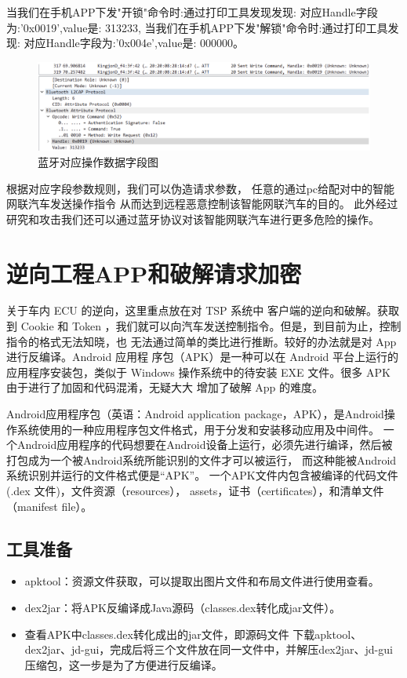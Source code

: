 当我们在手机APP下发"开锁"命令时:通过打印工具发现发现:
对应Handle字段为:'0x0019',value是: 313233,
当我们在手机APP下发"解锁"命令时:通过打印工具发现:
对应Handle字段为:'0x004e',value是: 000000。
\begin{figure}
    \centering
    \includegraphics[scale=0.5]{resources/img/i18.png}
    \caption{蓝牙对应操作数据字段图}
  \end{figure}
根据对应字段参数规则，我们可以伪造请求参数\cite{lu2005conditional}，
任意的通过pc给配对中的智能网联汽车发送操作指令
从而达到远程恶意控制该智能网联汽车的目的。
此外经过研究和攻击我们还可以通过蓝牙协议对该智能网联汽车进行更多危险的操作。

\section{逆向工程APP和破解请求加密
}
关于车内 ECU 的逆向，这里重点放在对 TSP 系统中
客户端的逆向和破解。获取到 Cookie 和 Token ，我们就可以向汽车发送控制指令。但是，到目前为止，控制指令的格式无法知晓，也
无法通过简单的类比进行推断。较好的办法就是对 App 进行反编译\cite{yang2015automated}。Android 应用程
序包（APK）是一种可以在 Android 平台上运行的应用程序安装包，类似于 Windows
操作系统中的待安装 EXE 文件。很多 APK 由于进行了加固和代码混淆，无疑大大
增加了破解 App 的难度。

Android应用程序包（英语：Android application package，APK），是Android操作系统使用的一种应用程序包文件格式，用于分发和安装移动应用及中间件。
一个Android应用程序的代码想要在Android设备上运行，必须先进行编译，然后被打包成为一个被Android系统所能识别的文件才可以被运行，
而这种能被Android系统识别并运行的文件格式便是“APK”。 
一个APK文件内包含被编译的代码文件(.dex 文件)，文件资源（resources）， assets，证书（certificates），和清单文件（manifest file）。

\subsection{工具准备}
\begin{itemize}
    \item apktool：资源文件获取，可以提取出图片文件和布局文件进行使用查看。
    \item dex2jar：将APK反编译成Java源码（classes.dex转化成jar文件）。
    \item 查看APK中classes.dex转化成出的jar文件，即源码文件 下载apktool、dex2jar、jd-gui，完成后将三个文件放在同一文件中，并解压dex2jar、jd-gui压缩包，这一步是为了方便进行反编译。
\end{itemize}

